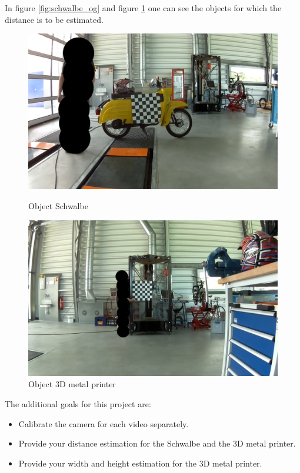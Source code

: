 In figure \ref{fig:schwalbe_og} and figure \ref{fig:printer_og} one can see the objects for which the distance is to be estimated.
\begin{figure}[H]
     \centering
     \captionsetup{justification=centering}
     \begin{minipage}[b]{0.5\textwidth}
        \centering
        \includegraphics[width=.95\textwidth]{image/1/schwalbe.png}
        \caption{Object Schwalbe}
        \label{fig:schwalbe_og}
     \end{minipage}%
     \begin{minipage}[b]{0.5\textwidth}
        \centering
        \includegraphics[width=.95\textwidth]{image/1/metal_printer.png}
        \caption{Object 3D metal printer}
        \label{fig:printer_og}
     \end{minipage}
\end{figure}

The additional goals for this project are:
\begin{itemize}[leftmargin=0.9cm]
    \item Calibrate the camera for each video separately.
    \item Provide your distance estimation  for the Schwalbe and the 3D metal printer.
    \item Provide your width and height estimation for the 3D metal printer.
\end{itemize}
    
